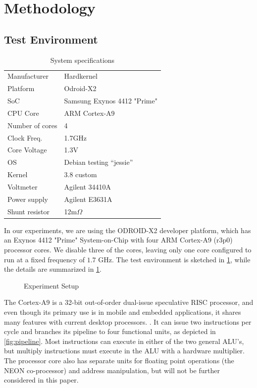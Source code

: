 \section{Methodology}

\subsection{Test Environment}
\begin{table}
    \begin{tabular}{l|l}
        \hline
        \hline
    Manufacturer    & Hardkernel\\
    Platform        & Odroid-X2\\
    SoC             & Samsung Exynos 4412 "Prime"\\
    CPU Core        & ARM Cortex-A9\\
    Number of cores & 4\\
    Clock Freq.     & 1.7GHz\\
    Core Voltage    & 1.3V\\
    OS              & Debian testing ``jessie''\\
    Kernel          & 3.8 custom\\
        \hline
        \hline
    Voltmeter       & Agilent 34410A\\
    Power supply    & Agilent E3631A\\
    Shunt resistor  & 12m$\Omega$\\
        \hline
        \hline
    \end{tabular}
    \caption{System specifications}
    \label{table:system_spec}
\end{table}

In our experiments, we are using the ODROID-X2 \cite{odroid-x2} developer
platform, which has an Exynos 4412 "Prime" System-on-Chip with four ARM
Cortex-A9 (r3p0) processor cores. We disable three of the cores, leaving only
one core configured to run at a fixed frequency of $1.7$ GHz. The test
environment is sketched in \ref{fig:setup}, while the details are summarized in
\ref{table:system_spec}.

\begin{figure}
    
    \caption{Experiment Setup}
    \label{fig:setup}
\end{figure}

The Cortex-A9 is a 32-bit out-of-order dual-issue speculative RISC processor,
and even though its primary use is in mobile and embedded applications, it
shares many features with current desktop processors. \cite{patterson}
\cite{hennessy}. It can issue two instructions per cycle and branches its
pipeline to four functional units, as depicted in \autoref{fig:pipeline}. Most
instructions can execute in either of the two general ALU's, but multiply
instructions must execute in the ALU with a hardware multiplier. The processor
core also has separate units for floating point operations (the NEON
co-processor) and address manipulation, but will not be further considered in
this paper.

